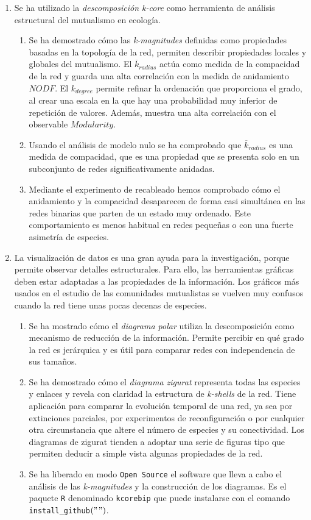 \begin{enumerate}
\item Se ha utilizado la \textit{descomposición k-core} como herramienta de análisis estructural del mutualismo en ecología. 
	\begin{enumerate}
	\item Se ha demostrado cómo las \textit{k-magnitudes} definidas como propiedades basadas en la topología de la red, permiten describir propiedades locales y globales del mutualismo. El $\overline {k}_{radius}$ actúa como medida de la compacidad de la red y guarda una alta correlación con la medida de anidamiento $NODF$. El ${k}_{degree}$ permite refinar la ordenación que proporciona el grado, al crear una escala en la que hay una probabilidad muy inferior de repetición de valores. Además, muestra una alta correlación con el observable $Modularity$.
	\item Usando el análisis de modelo nulo se ha comprobado que $\overline {k}_{radius}$ es una medida de compacidad, que es una propiedad que se presenta solo en un subconjunto de redes significativamente anidadas.
	\item Mediante el experimento de recableado hemos comprobado cómo el anidamiento y la compacidad desaparecen de forma casi simultánea en las redes binarias que parten de un estado muy ordenado. Este comportamiento es menos habitual en redes pequeñas o con una fuerte asimetría de especies.
	\end{enumerate}

\item La visualización de datos es una gran ayuda para la investigación, porque permite observar detalles estructurales. Para ello, las herramientas gráficas deben estar adaptadas a las propiedades de la información. Los gráficos más usados en el estudio de las comunidades mutualistas se vuelven muy confusos cuando la red tiene unas pocas decenas de especies. 
	\begin{enumerate}
	\item Se ha mostrado cómo el \textit{diagrama polar} utiliza la descomposición como mecanismo de reducción de la información. Permite percibir en qué grado la red es jerárquica y es útil para comparar redes con independencia de sus tamaños.
	\item Se ha demostrado cómo el \textit{diagrama zigurat} representa todas las especies y enlaces y revela con claridad la estructura de \textit{k-shells} de la red. Tiene aplicación para comparar la evolución temporal de una red, ya sea por extinciones parciales, por experimentos de reconfiguración o por cualquier otra circunstancia que altere el número de especies y su conectividad. Los diagramas de zigurat tienden a adoptar una serie de figuras tipo que permiten deducir a simple vista algunas propiedades de la red.
	\item Se ha liberado en modo \texttt{Open Source} el software que lleva a cabo el análisis de las \textit{k-magnitudes} y la construcción de los diagramas. Es el paquete \texttt{R} denominado \texttt{kcorebip} que puede instalarse con el comando \texttt{install\_github}$("$$")$.
	\end{enumerate}


\end{enumerate}
